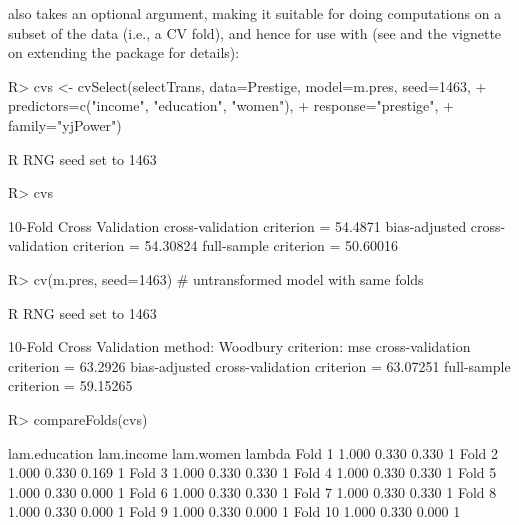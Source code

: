 \documentclass[
]{jss}
\begin{document}
 also takes an optional  argument,
making it suitable for doing computations on a subset of the data (i.e.,
a CV fold), and hence for use with  (see
 and the vignette on extending the  package
for details):

\begin{CodeChunk}
\begin{CodeInput}
R> cvs <- cvSelect(selectTrans, data=Prestige, model=m.pres, seed=1463,
+                 predictors=c("income", "education", "women"),
+                 response="prestige",
+                 family="yjPower")
\end{CodeInput}
\begin{CodeOutput}
R RNG seed set to 1463
\end{CodeOutput}
\begin{CodeInput}
R> cvs
\end{CodeInput}
\begin{CodeOutput}
10-Fold Cross Validation
cross-validation criterion = 54.4871
bias-adjusted cross-validation criterion = 54.30824
full-sample criterion = 50.60016 
\end{CodeOutput}
\begin{CodeInput}
R> cv(m.pres, seed=1463) # untransformed model with same folds
\end{CodeInput}
\begin{CodeOutput}
R RNG seed set to 1463
\end{CodeOutput}
\begin{CodeOutput}
10-Fold Cross Validation
method: Woodbury
criterion: mse
cross-validation criterion = 63.2926
bias-adjusted cross-validation criterion = 63.07251
full-sample criterion = 59.15265 
\end{CodeOutput}
\begin{CodeInput}
R> compareFolds(cvs)
\end{CodeInput}
\begin{CodeOutput}
        lam.education lam.income lam.women lambda
Fold 1          1.000      0.330     0.330      1
Fold 2          1.000      0.330     0.169      1
Fold 3          1.000      0.330     0.330      1
Fold 4          1.000      0.330     0.330      1
Fold 5          1.000      0.330     0.000      1
Fold 6          1.000      0.330     0.330      1
Fold 7          1.000      0.330     0.330      1
Fold 8          1.000      0.330     0.000      1
Fold 9          1.000      0.330     0.000      1
Fold 10         1.000      0.330     0.000      1
\end{CodeOutput}
\end{CodeChunk}
\end{document}
